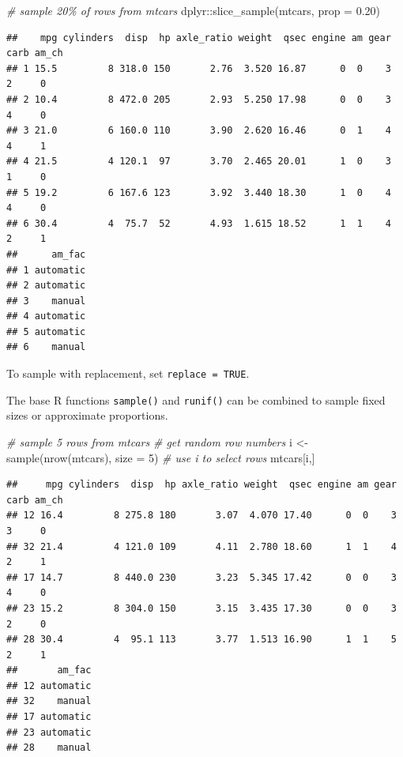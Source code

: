 \documentclass[
]{book}
\newenvironment{Shaded}{\begin{snugshade}}{\end{snugshade}}
\newcommand{\AttributeTok}[1]{\textcolor[rgb]{0.77,0.63,0.00}{#1}}
\newcommand{\CommentTok}[1]{\textcolor[rgb]{0.56,0.35,0.01}{\textit{#1}}}
\newcommand{\DecValTok}[1]{\textcolor[rgb]{0.00,0.00,0.81}{#1}}
\newcommand{\FloatTok}[1]{\textcolor[rgb]{0.00,0.00,0.81}{#1}}
\newcommand{\FunctionTok}[1]{\textcolor[rgb]{0.00,0.00,0.00}{#1}}
\newcommand{\NormalTok}[1]{#1}
\newcommand{\OtherTok}[1]{\textcolor[rgb]{0.56,0.35,0.01}{#1}}
\newcommand{\SpecialCharTok}[1]{\textcolor[rgb]{0.00,0.00,0.00}{#1}}
\begin{document}
\begin{Shaded}
\begin{Highlighting}[]
\CommentTok{\# sample 20\% of rows from mtcars}
\NormalTok{dplyr}\SpecialCharTok{::}\FunctionTok{slice\_sample}\NormalTok{(mtcars, }\AttributeTok{prop =} \FloatTok{0.20}\NormalTok{)}
\end{Highlighting}
\end{Shaded}

\begin{verbatim}
##    mpg cylinders  disp  hp axle_ratio weight  qsec engine am gear carb am_ch
## 1 15.5         8 318.0 150       2.76  3.520 16.87      0  0    3    2     0
## 2 10.4         8 472.0 205       2.93  5.250 17.98      0  0    3    4     0
## 3 21.0         6 160.0 110       3.90  2.620 16.46      0  1    4    4     1
## 4 21.5         4 120.1  97       3.70  2.465 20.01      1  0    3    1     0
## 5 19.2         6 167.6 123       3.92  3.440 18.30      1  0    4    4     0
## 6 30.4         4  75.7  52       4.93  1.615 18.52      1  1    4    2     1
##      am_fac
## 1 automatic
## 2 automatic
## 3    manual
## 4 automatic
## 5 automatic
## 6    manual
\end{verbatim}

To sample with replacement, set \texttt{replace\ =\ TRUE}.

The base R functions \texttt{sample()} and \texttt{runif()} can be combined to sample fixed sizes or approximate proportions.

\begin{Shaded}
\begin{Highlighting}[]
\CommentTok{\# sample 5 rows from mtcars}
\CommentTok{\# get random row numbers}
\NormalTok{i }\OtherTok{\textless{}{-}} \FunctionTok{sample}\NormalTok{(}\FunctionTok{nrow}\NormalTok{(mtcars), }\AttributeTok{size =} \DecValTok{5}\NormalTok{)}
\CommentTok{\# use i to select rows}
\NormalTok{mtcars[i,]}
\end{Highlighting}
\end{Shaded}

\begin{verbatim}
##     mpg cylinders  disp  hp axle_ratio weight  qsec engine am gear carb am_ch
## 12 16.4         8 275.8 180       3.07  4.070 17.40      0  0    3    3     0
## 32 21.4         4 121.0 109       4.11  2.780 18.60      1  1    4    2     1
## 17 14.7         8 440.0 230       3.23  5.345 17.42      0  0    3    4     0
## 23 15.2         8 304.0 150       3.15  3.435 17.30      0  0    3    2     0
## 28 30.4         4  95.1 113       3.77  1.513 16.90      1  1    5    2     1
##       am_fac
## 12 automatic
## 32    manual
## 17 automatic
## 23 automatic
## 28    manual
\end{verbatim}
\end{document}
